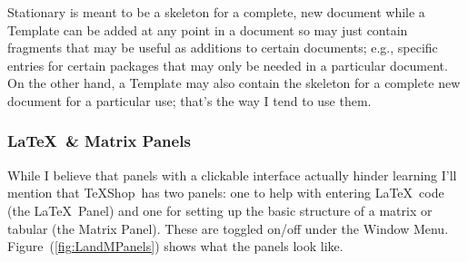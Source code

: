\documentclass[letterpaper,11pt]{article}
\newcommand{\TS}{\textsf{\TeX Shop}}
\newcommand{\mnu}[1]{\textsf{#1}}
\begin{document}
Stationary is meant to be a skeleton for a complete, new document while a Template can be added at any point in a document so may just contain fragments that may be useful as additions to certain documents; e.g., specific entries for certain packages that may only be needed in a particular document. On the other hand, a Template may also contain the skeleton for a complete new document for a particular use; that's the way I tend to use them.

\subsubsection{\LaTeX\ \& Matrix Panels}

While I believe that panels with a clickable interface actually hinder learning I'll mention that \TS\ has two panels: one to help with entering \LaTeX\ code (the \LaTeX\ Panel) and one for setting up the basic structure of a matrix or tabular (the Matrix Panel). These are toggled on/off under the \mnu{Window} Menu. %
 Figure~(\ref{fig:LandMPanels}) shows what the panels look like.
\end{document}
